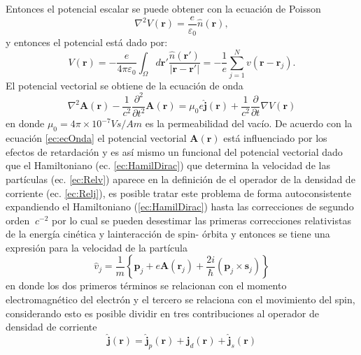 \documentclass[12pt,a4paper, oneside]{book}
\begin{document}
    Entonces el potencial escalar se puede obtener con la ecuaci\'on de Poisson
    \begin{equation}
    \nabla^2 V(\pmb{r}) = \frac{e}{\varepsilon_0} \hat{n} (\pmb{r}), \label{ec:poisson}
    \end{equation}
    y entonces el potencial est\'a dado por:
    \begin{equation}
    V(\pmb{r}) = - \frac{e}{4 \pi \varepsilon_0} \int_{\Omega} d \pmb{r'} \frac{\hat{n} (\pmb{r'})}{|\pmb{r}-\pmb{r'}|}= - \frac{1}{e} \sum_{j=1}^{N} v(\pmb{r}-\pmb{r}_j). \label{ec:solPoisson}
    \end{equation}
    \newline
    El potencial vectorial se obtiene de la ecuaci\'on de onda 
    \begin{equation}
    \nabla^2 \pmb{A} (\pmb{r}) - \frac{1}{c^2} \frac{\partial^2 }{\partial t^2} \pmb{A} (\pmb{r}) = \mu_0 e \pmb{\hat{j}} (\pmb{r}) + \frac{1}{c^2} \frac{\partial}{\partial t} \nabla V(\pmb{r}) \label{ec:ecOnda}  
    \end{equation}
    en donde $\mu_0 = 4 \pi \times10^{-7} Vs/Am$ es la permeabilidad del vac\'io.
    \newline
    De acuerdo con la ecuaci\'on \ref{ec:ecOnda} el potencial vectorial $\pmb{A} (\pmb{r})$ est\'a influenciado por los efectos de retardaci\'on y es as\'i mismo un funcional del potencial vectorial dado que el Hamiltoniano (ec. \ref{ec:HamilDirac}) que determina la velocidad de las part\'iculas (ec. \ref{ec:Relv}) aparece en la definici\'on de el operador de la densidad de corriente (ec. \ref{ec:Relj}), es posible tratar este problema de forma autoconsistente expandiendo el Hamiltoniano (\ref{ec:HamilDirac}) hasta las correcciones de segundo orden $~ c^{-2}$ por lo cual se pueden desestimar las primeras correcciones relativistas de la energ\'ia cin\'etica  y lainteracci\'on de spin- \'orbita y entonces se tiene una expresi\'on para la velocidad de la part\'icula
    \begin{equation}
    	\hat{v}_j = \frac{1}{m} \left\{\pmb{p}_j + e \pmb{A} (\pmb{r}_j) + \frac{2i}{\hbar} (\pmb{p}_j \times \pmb{s}_j) \right\} \label{ec:vel_corr}
    \end{equation}  
    en donde los dos primeros t\'erminos se relacionan con el momento electromagn\'etico  del electr\'on y el tercero se relaciona con el movimiento del spin, considerando esto es posible dividir en tres contribuciones al operador de densidad de corriente
    \begin{equation}
    \hat{\pmb{j}} (\pmb{r}) = \hat{\pmb{j}}_p (\pmb{r}) + \hat{\pmb{j}}_d (\pmb{r}) + \hat{\pmb{j}}_s (\pmb{r}) \label{ec:divJ}
    \end{equation}
\end{document}
